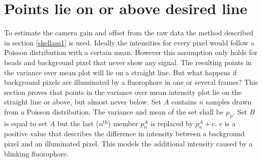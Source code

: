 \section{Points lie on or above desired line}\label{pointsabove}
To estimate the camera gain and offset from the raw data the method described in section \ref{skellam1} is used. Ideally the intensities for every pixel would follow a Poisson distribution with a certain mean. However this assumption only holds for beads and background pixel that never show any signal. The resulting points in the variance over mean plot will lie on a straight line. But what happens if background pixels are illuminated by a fluorophore in one or several frames?\newline
This section proves that points in the variance over mean intensity plot lie on the straight line or above, but almost never below.\newline
Set $A$ contains $n$ samples drawn from a Poisson distribution. The variance and mean of the set shall be $\mu_p$. Set $B$ is equal to set $A$ but the last ($n^\text{th}$) member $p_n^A$ is replaced by $p_n^A+c$. $c$ is a positive value that describes the difference in intensity between a background pixel and an illuminated pixel. This models the additional intensity caused by a blinking fluorophore. \newline  


